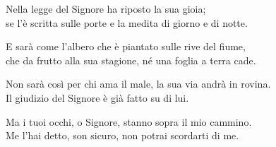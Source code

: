 

\spazio

\strofa Nella legge del Signore ha riposto la sua gioia;\\
se l'è scritta sulle porte e la medita di giorno e di notte.

\spazio


\spazio

\strofa E sarà come l'albero che è piantato sulle rive del fiume,\\
che da frutto alla sua stagione, né una foglia a terra cade.

\spazio


\spazio

\strofa Non sarà così per chi ama il male, la sua via andrà in rovina.\\
Il giudizio del Signore è già fatto su di lui.

\spazio


\spazio

\strofa Ma i tuoi occhi, o Signore, stanno sopra il mio cammino.\\
Me l'hai detto, son sicuro, non potrai scordarti di me.

\spazio

